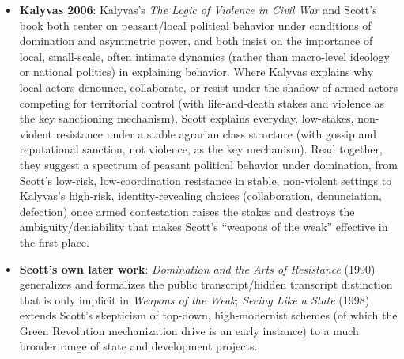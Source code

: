 \documentclass[12pt]{article}
\begin{document}
\begin{itemize}[leftmargin=*, itemsep=4pt]
    \item \textbf{Kalyvas 2006}: Kalyvas's \textit{The Logic of Violence in Civil War} and Scott's book both center on peasant/local political behavior under conditions of domination and asymmetric power, and both insist on the importance of local, small-scale, often intimate dynamics (rather than macro-level ideology or national politics) in explaining behavior. Where Kalyvas explains why local actors denounce, collaborate, or resist under the shadow of armed actors competing for territorial control (with life-and-death stakes and violence as the key sanctioning mechanism), Scott explains everyday, low-stakes, non-violent resistance under a stable agrarian class structure (with gossip and reputational sanction, not violence, as the key mechanism). Read together, they suggest a spectrum of peasant political behavior under domination, from Scott's low-risk, low-coordination resistance in stable, non-violent settings to Kalyvas's high-risk, identity-revealing choices (collaboration, denunciation, defection) once armed contestation raises the stakes and destroys the ambiguity/deniability that makes Scott's ``weapons of the weak'' effective in the first place.
    \item \textbf{Scott's own later work}: \textit{Domination and the Arts of Resistance} (1990) generalizes and formalizes the public transcript/hidden transcript distinction that is only implicit in \textit{Weapons of the Weak}; \textit{Seeing Like a State} (1998) extends Scott's skepticism of top-down, high-modernist schemes (of which the Green Revolution mechanization drive is an early instance) to a much broader range of state and development projects.
\end{itemize}
\end{document}
